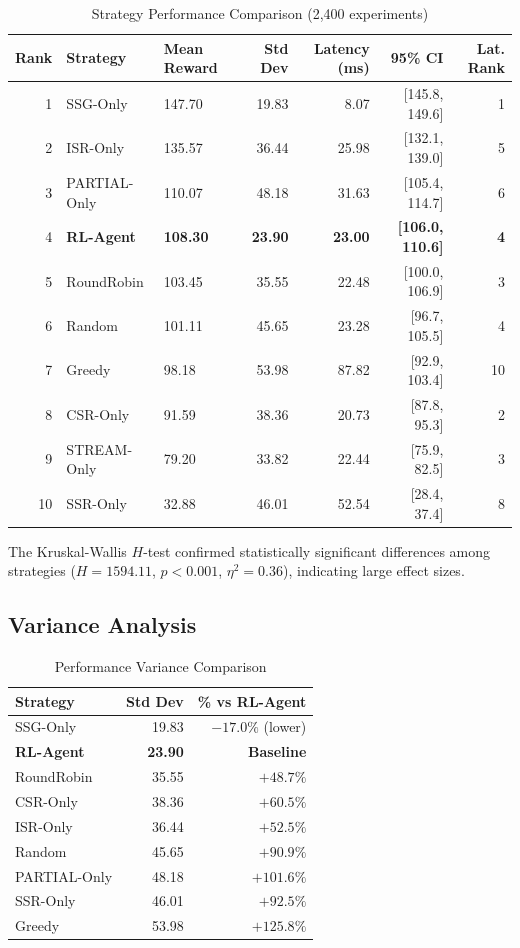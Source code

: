 \documentclass[10pt,twocolumn]{article}
\begin{document}
\begin{table}[t]
\centering
\caption{Strategy Performance Comparison (2,400 experiments)}
\label{tab:performance}
\small
\begin{tabular}{rllrrrr}
\toprule
\textbf{Rank} & \textbf{Strategy} & \textbf{Mean Reward} & \textbf{Std Dev} & \textbf{Latency (ms)} & \textbf{95\% CI} & \textbf{Lat. Rank} \\
\midrule
1 & SSG-Only & 147.70 & 19.83 & 8.07 & [145.8, 149.6] & 1 \\
2 & ISR-Only & 135.57 & 36.44 & 25.98 & [132.1, 139.0] & 5 \\
3 & PARTIAL-Only & 110.07 & 48.18 & 31.63 & [105.4, 114.7] & 6 \\
4 & \textbf{RL-Agent} & \textbf{108.30} & \textbf{23.90} & \textbf{23.00} & \textbf{[106.0, 110.6]} & \textbf{4} \\
5 & RoundRobin & 103.45 & 35.55 & 22.48 & [100.0, 106.9] & 3 \\
6 & Random & 101.11 & 45.65 & 23.28 & [96.7, 105.5] & 4 \\
7 & Greedy & 98.18 & 53.98 & 87.82 & [92.9, 103.4] & 10 \\
8 & CSR-Only & 91.59 & 38.36 & 20.73 & [87.8, 95.3] & 2 \\
9 & STREAM-Only & 79.20 & 33.82 & 22.44 & [75.9, 82.5] & 3 \\
10 & SSR-Only & 32.88 & 46.01 & 52.54 & [28.4, 37.4] & 8 \\
\bottomrule
\end{tabular}
\end{table}

The Kruskal-Wallis $H$-test confirmed statistically significant differences among strategies ($H = 1594.11$, $p < 0.001$, $\eta^2 = 0.36$), indicating large effect sizes.

\subsection{Variance Analysis}

\begin{table}[t]
\centering
\caption{Performance Variance Comparison}
\label{tab:variance}
\small
\begin{tabular}{lrr}
\toprule
\textbf{Strategy} & \textbf{Std Dev} & \textbf{\% vs RL-Agent} \\
\midrule
SSG-Only & 19.83 & $-17.0\%$ (lower) \\
\textbf{RL-Agent} & \textbf{23.90} & \textbf{Baseline} \\
RoundRobin & 35.55 & $+48.7\%$ \\
CSR-Only & 38.36 & $+60.5\%$ \\
ISR-Only & 36.44 & $+52.5\%$ \\
Random & 45.65 & $+90.9\%$ \\
PARTIAL-Only & 48.18 & $+101.6\%$ \\
SSR-Only & 46.01 & $+92.5\%$ \\
Greedy & 53.98 & $+125.8\%$ \\
\bottomrule
\end{tabular}
\end{table}
\end{document}
